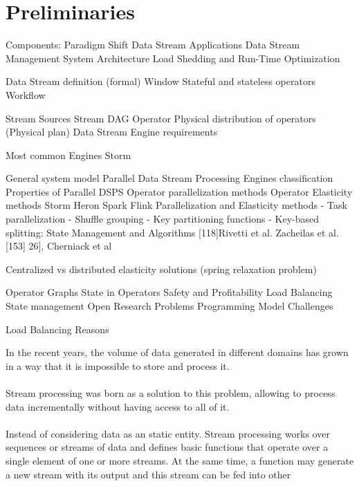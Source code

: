\chapter{Preliminaries
  \label{chapter:preliminaries}}

  Components:
  \cite{chakravarthy2009stream}
    Paradigm Shift
    Data Stream Applications
    Data Stream Management System Architecture
  Load Shedding and Run-Time Optimization


  \cite{KottoKombi2015ParallelAD}
    Data Stream definition (formal)
    Window
    Stateful and stateless operators
    Workflow

  \cite{kamburugamuve2013survey}
    Stream Sources
    Stream
    DAG
    Operator
    Physical distribution of operators (Physical plan)
    Data Stream Engine requirements

    Most common Engines
Storm

  \cite{R_ger_2019}
  General system model
  Parallel Data Stream Processing Engines classification
Properties of Parallel DSPS
Operator parallelization methods
Operator Elasticity methods
Storm
Heron
Spark
Flink
Parallelization and Elasticity methods
- Task parallelization
- Shuffle grouping
- Key partitioning functions
- Key-based splitting: State Management and Algorithms
[118]Rivetti et al.
Zacheilas et al. [153]
26], Cherniack et al

Centralized vs distributed elasticity solutions (spring relaxation problem)

  \cite{Schneider_2013}
Operator Graphs
State in Operators
Safety and Profitability
Load Balancing
State management
Open Research Problems
Programming Model Challenges

  \cite{Hirzel_2014}
Load Balancing
  Reasons



  In the recent years, the volume of data generated in different domains has
  grown in a way that it is impossible to store and process it.\\\\

  Stream processing was born as a solution to this problem, allowing to process
  data incrementally without having access to all of it.\\\\

  Instead of considering data as an static entity. Stream processing works over
  sequences or streams of data and defines basic functions that operate over a
  single element of one or more streams. At the same time, a function may
  generate a new stream with its output and this stream can be fed into other


